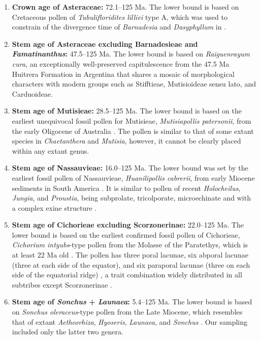 \begin{enumerate}

\item \textbf{Crown age of Asteraceae:} 72.1--125 Ma. The lower bound
  is based on Cretaceous pollen of \textit{Tubulifloridites lilliei}
  type A, which was used to constrain of the divergence time of
  \textit{Barnadesia} and \textit{Dasyphyllum} in
  \cite{Barreda2015}.

\item \textbf{Stem age of Asteraceae excluding Barnadesieae and
    \textit{Famatinanthus}:} 47.5--125 Ma. The lower bound is based
  on \textit{Raiguenrayum cura}, an exceptionally well-preserved
  capitulescence from the 47.5 Ma Huitrera Formation in Argentina
  \citep{Barreda2010,Barreda2012} that shares a mosaic of
  morphological characters with modern groups such as Stifftieae,
  Mutisioideae sensu lato, and Carduoideae.

\item \textbf{Stem age of Mutisieae:} 28.5--125 Ma. The lower bound
  is based on the earliest unequivocal fossil pollen for Mutisieae,
  \textit{Mutisiapollis patersonii}, from the early Oligocene of
  Australia \citep{Macphail1994}. The pollen is similar to that of
  some extant species in \textit{Chaetanthera} and \textit{Mutisia},
  however, it cannot be clearly placed within any extant genus.

\item \textbf{Stem age of Nassauvieae:} 16.0--125 Ma. The lower
  bound was set by the earliest fossil pollen of Nassauvieae,
  \textit{Huanilipollis cabrerii}, from early Miocene sediments in
  South America \citep{Barreda2008,Barreda2010}. It is similar to
  pollen of recent \textit{Holocheilus}, \textit{Jungia}, and
  \textit{Proustia}, being subprolate, tricolporate, microechinate and
  with a complex exine structure \citep{Barreda2008}.

\item \textbf{Stem age of Cichorieae excluding Scorzonerinae:}
  22.0--125 Ma. The lower bound is based on the earliest confirmed
  fossil pollen of Cichorieae, \textit{Cichorium intyubs}-type pollen
  from the Molasse of the Paratethys, which is at least 22 Ma old
  \citep{Hochuli1978}. The pollen has three poral lacunae, six abporal
  lacunae (three at each side of the equator), and six paraporal
  lacunae (three on each side of the equatorial ridge)
  \citep{Blackmore1984}, a trait combination widely distributed in all
  subtribes except Scorzonerinae \citep{Tremetsberger2013}.

\item \textbf{Stem age of \textit{Sonchus} + \textit{Launaea}:}
  5.4--125 Ma. The lower bound is based on \textit{Sonchus
    oleraceus}-type pollen from the Late Miocene, which resembles that
  of extant \textit{Aetheorhiza}, \textit{Hyoseris}, \textit{Launaea},
  and \textit{Sonchus} \citep{Blackmore1986}. Our sampling included
  only the latter two genera.

\end{enumerate}

